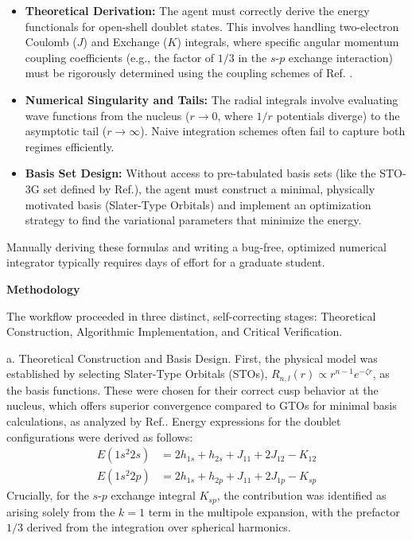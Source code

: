 \documentclass[11pt, a4paper, logo, copyright, nonumbering]{SAI}
\begin{document}
\vspace{-1.6ex}
\begin{itemize}
    \item \textbf{Theoretical Derivation:} The agent must correctly derive the energy functionals for open-shell doublet states. This involves handling two-electron Coulomb ($J$) and Exchange ($K$) integrals, where specific angular momentum coupling coefficients (e.g., the factor of $1/3$ in the $s$-$p$ exchange interaction) must be rigorously determined using the coupling schemes of Ref. \cite{condon1935theory}.
    \item \textbf{Numerical Singularity and Tails:} The radial integrals involve evaluating wave functions from the nucleus ($r \to 0$, where $1/r$ potentials diverge) to the asymptotic tail ($r \to \infty$). Naive integration schemes often fail to capture both regimes efficiently.
    \item \textbf{Basis Set Design:} Without access to pre-tabulated basis sets  (like the STO-3G set defined by Ref.\cite{Hehre:1969}), the agent must construct a minimal, physically motivated basis (Slater-Type Orbitals) and implement an optimization strategy to find the variational parameters that minimize the energy.
\end{itemize}
\vspace{-1.6ex}

Manually deriving these formulas and writing a bug-free, optimized numerical integrator typically requires days of effort for a graduate student.

\noindent \textbf{Methodology}

The workflow proceeded in three distinct, self-correcting stages: Theoretical Construction, Algorithmic Implementation, and Critical Verification.

\medskip
{a. Theoretical Construction and Basis Design.}
First, the physical model was established by selecting Slater-Type Orbitals (STOs), $R_{n,l}(r) \propto r^{n-1}e^{-\zeta r}$, as the basis functions. These were chosen for their correct cusp behavior at the nucleus, which offers superior convergence compared to GTOs for minimal basis
calculations, as analyzed by Ref.\cite{Slater:1930}.
Energy expressions for the doublet configurations were derived as follows:
\begin{align*}
    E(1s^2 2s) &= 2h_{1s} + h_{2s} + J_{11} + 2J_{12} - K_{12} \\
    E(1s^2 2p) &= 2h_{1s} + h_{2p} + J_{11} + 2J_{1p} - K_{sp}
\end{align*}
Crucially, for the $s$-$p$ exchange integral $K_{sp}$, the contribution was identified as arising solely from the $k=1$ term in the multipole expansion, with the prefactor $1/3$ derived from the integration over spherical harmonics.
\end{document}
